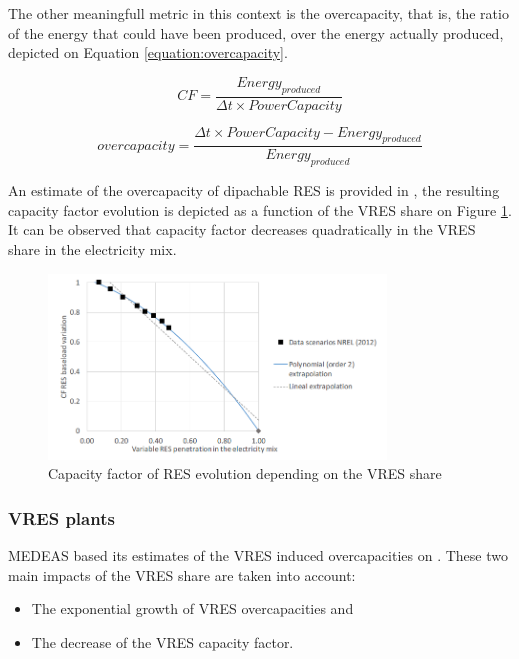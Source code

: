 The other meaningfull metric in this context is the overcapacity, that is, the ratio of the energy that could have been produced, over the energy actually produced, depicted on Equation \ref{equation:overcapacity}. 

\begin{equation}
    CF = \frac{Energy_{produced}}{\Delta t \times PowerCapacity}
    \label{equation:CF-definition}
\end{equation}

\begin{equation}
    overcapacity = \frac{\Delta t \times PowerCapacity - Energy_{produced}}{Energy_{produced}}
    \label{equation:overcapacity}
\end{equation}

An estimate of the overcapacity of dipachable RES is provided in \cite{NREL}, the resulting capacity factor evolution is depicted as a function of the VRES share on Figure \ref{fig:cfres-vreshare}. It can be observed that capacity factor decreases quadratically in the VRES share in the electricity mix.

\begin{figure}[h]
    \includegraphics[width=0.8\textwidth]{resources/images/cfres-vreshsare.png}
    \caption{Capacity factor of RES evolution depending on the VRES share \cite{NREL}}
    \label{fig:cfres-vreshare}
\end{figure}

\subsubsection{VRES plants}

MEDEAS based its estimates of the VRES induced overcapacities on \cite{delarue}. These two main impacts of the VRES share are taken into account:
\begin{itemize}
    \item The exponential growth of VRES overcapacities and
    \item The decrease of the VRES capacity factor.
\end{itemize}


